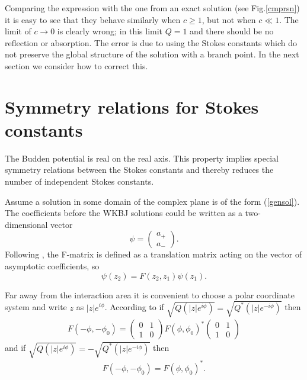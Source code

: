 \documentclass[aip,jmp,reprint]{revtex4-1}
\begin{document}
Comparing the expression with the one from an exact solution (see Fig.\ref{cmprsn}) it is easy to see that they behave similarly when \mbox{$c\geq1$}, but not when \mbox{$c\ll 1$}. The limit of \mbox{$c\rightarrow 0$} is clearly wrong; in this limit \mbox{$Q=1$}
and there should be no reflection or absorption. The error is due to using the Stokes constants which do not preserve the global structure of the solution with a branch point. In the next section we consider how to correct this. 

\section{Symmetry relations for Stokes constants \label{symmetries}}
The Budden potential is real on the real axis. This property implies special symmetry relations between the Stokes constants  and thereby reduces the number of independent Stokes constants.

Assume a solution in some domain of the complex plane is of the form (\ref{gensol}). The coefficients before the WKBJ solutions could be written as a two-dimensional vector
\[
\psi=\left( \begin{array}{c} a_+ \\ a_- \end{array} \right).
\]
Following \cite[pp~21-33]{froman}, the F-matrix is defined as a translation matrix acting on the vector of asymptotic coefficients, so
\[
\psi(z_2)=F(z_2,z_1)\psi(z_1).
\]

Far away from the interaction area it is convenient to choose a polar coordinate system and write $z$ as $|z| e^{i \phi}$.
According to \cite{symm} if \mbox{$\sqrt{Q(|z|e^{i \phi})}=\sqrt{Q^*(|z|e^{-i \phi})}$} then
\begin{eqnarray}
F(-\phi,-\phi_0)=
\left( \begin{array}{cc} 0 & 1 \\ 1 & 0 \end{array} \right)
F(\phi,\phi_0)^*
\left( \begin{array}{cc} 0 & 1 \\ 1 & 0 \end{array} \right)
    \label{fmatrsym1}
\end{eqnarray}
and if \mbox{$\sqrt{Q(|z|e^{i \phi})}=-\sqrt{Q^*(|z|e^{-i \phi})}$} then 
\begin{eqnarray}
F(-\phi,-\phi_0)=F(\phi,\phi_0)^*.
    \label{fmatrsym2}
\end{eqnarray}
\end{document}
